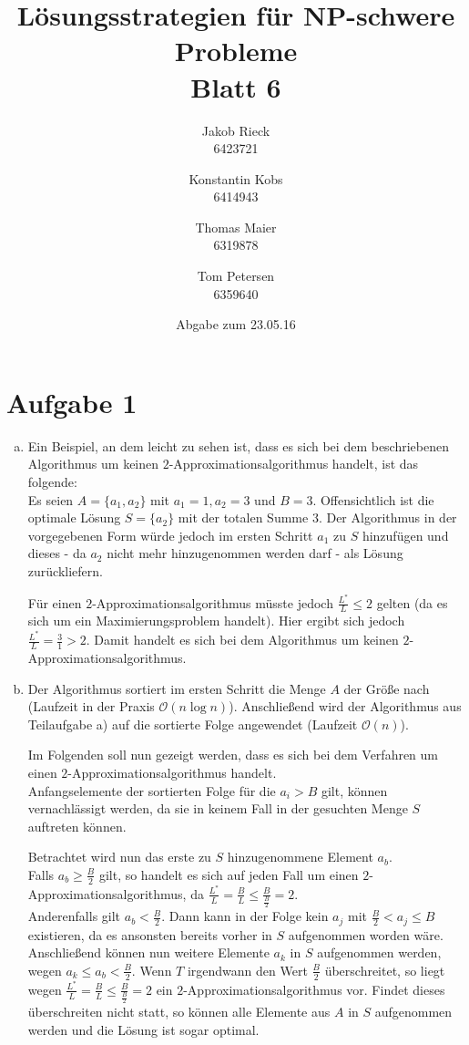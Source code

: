 \documentclass[12pt,a4paper]{article}
\title{Lösungsstrategien für NP-schwere Probleme\\Blatt 6}
\author{
		Jakob Rieck\\
		\small{6423721}
	\and
		Konstantin Kobs\\
		\small{6414943}
	\and
		Thomas Maier\\
		\small{6319878}
	\and
		Tom Petersen\\
		\small{6359640}
}
\date{Abgabe zum 23.05.16}
\begin{document}
\maketitle

\section*{Aufgabe 1}

 \begin{enumerate}[a)]

 	\item Ein Beispiel, an dem leicht zu sehen ist, dass es sich bei dem beschriebenen Algorithmus um keinen \(2\)-Approximationsalgorithmus handelt, ist das folgende:\\	
 	 Es seien \(A = \{a_1, a_2\}\) mit \(a_1 = 1, a_2 = 3\) und \(B = 3\). Offensichtlich ist die optimale Lösung \(S = \{a_2\}\) mit der totalen Summe \(3\). Der Algorithmus in der vorgegebenen Form würde jedoch im ersten Schritt \(a_1\) zu \(S\) hinzufügen und dieses - da \(a_2\) nicht mehr hinzugenommen werden darf - als Lösung zurückliefern. 
 	 
 	 Für einen \(2\)-Approximationsalgorithmus müsste jedoch \(\frac{L^*}{L} \le 2\) gelten (da es sich um ein Maximierungsproblem handelt). Hier ergibt sich jedoch \(\frac{L^*}{L} = \frac{3}{1} > 2\). Damit handelt es sich bei dem Algorithmus um keinen \(2\)-Approximationsalgorithmus.
 	
 	\item Der Algorithmus sortiert im ersten Schritt die Menge \(A\) der Größe nach (Laufzeit in der Praxis \(\mathcal{O}(n \log n)\)). Anschließend wird der Algorithmus aus Teilaufgabe a) auf die sortierte Folge angewendet (Laufzeit \(\mathcal{O}(n)\)).
 	
 	Im Folgenden soll nun gezeigt werden, dass es sich bei dem Verfahren um einen \(2\)-Approximationsalgorithmus handelt.\\
 	Anfangselemente der sortierten Folge für die \(a_i > B\) gilt, können vernachlässigt werden, da sie in keinem Fall in der gesuchten Menge \(S\) auftreten können. 
 	
 	Betrachtet wird nun das erste zu \(S\) hinzugenommene Element \(a_b\).\\
 	Falls \(a_b \ge \frac{B}{2}\) gilt, so handelt es sich auf jeden Fall um einen \(2\)-Appro\-xi\-ma\-tions\-algorithmus, da \(\frac{L^*}{L} = \frac{B}{L} \le \frac{B}{\frac{B}{2}} = 2\).\\
 	Anderenfalls gilt \(a_b < \frac{B}{2}\). Dann kann in der Folge kein \(a_j\) mit \(\frac{B}{2} < a_j \le B\) existieren, da es ansonsten bereits vorher in \(S\) aufgenommen worden wäre. Anschließend können nun weitere Elemente \(a_k\) in \(S\) aufgenommen werden, wegen \(a_k \le a_b < \frac{B}{2}\). Wenn \(T\) irgendwann den Wert \(\frac{B}{2}\) überschreitet, so liegt wegen \(\frac{L^*}{L} = \frac{B}{L} \le \frac{B}{\frac{B}{2}} = 2\) ein \(2\)-Appro\-xi\-ma\-tions\-algorithmus vor. Findet dieses überschreiten nicht statt, so können alle Elemente aus \(A\) in \(S\) aufgenommen werden und die Lösung ist sogar optimal. 
 	

\end{enumerate}
\end{document}
